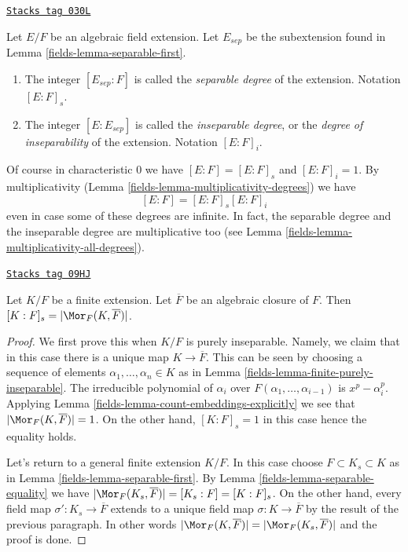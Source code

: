 \begin{definition}
\label{fields-definition-insep-degree}
\href{https://stacks.math.columbia.edu/tag/030L}{\texttt{Stacks tag 030L}}

Let $E/F$ be an algebraic field extension. Let $E_{sep}$ be the subextension
found in Lemma \ref{fields-lemma-separable-first}.
\begin{enumerate}
\item The integer $[E_{sep} : F]$ is called the {\it separable
degree} of the extension. Notation $[E : F]_s$.
\item The integer $[E : E_{sep}]$ is called the {\it inseparable
degree}, or the {\it degree of inseparability} of the extension.
Notation $[E : F]_i$.
\end{enumerate}
\end{definition}

Of course in characteristic $0$ we have $[E : F] = [E : F]_s$ and
$[E : F]_i = 1$. By multiplicativity
(Lemma \ref{fields-lemma-multiplicativity-degrees}) we have
$$
[E : F] = [E : F]_s [E : F]_i
$$
even in case some of these degrees are infinite. In fact, the separable
degree and the inseparable degree are multiplicative too (see
Lemma \ref{fields-lemma-multiplicativity-all-degrees}).

\begin{lemma}
\label{fields-lemma-separable-degree}
\href{https://stacks.math.columbia.edu/tag/09HJ}{\texttt{Stacks tag 09HJ}}

Let $K/F$ be a finite extension. Let $\overline{F}$ be an algebraic
closure of $F$. Then $[K : F]_s = |\Mor_F(K, \overline{F})|$.
\end{lemma}

\begin{proof}

We first prove this when $K/F$ is purely inseparable. Namely, we claim that
in this case there is a unique map $K \to \overline{F}$. This can be
seen by choosing a sequence of elements $\alpha_1, \ldots, \alpha_n \in K$
as in Lemma \ref{fields-lemma-finite-purely-inseparable}. The irreducible polynomial
of $\alpha_i$ over $F(\alpha_1, \ldots, \alpha_{i - 1})$ is $x^p - \alpha_i^p$.
Applying Lemma \ref{fields-lemma-count-embeddings-explicitly} we see that
$|\Mor_F(K, \overline{F})| = 1$. On the other hand, $[K : F]_s = 1$
in this case hence the equality holds.

\medskip\noindent
Let's return to a general finite extension $K/F$. In this case
choose $F \subset K_s \subset K$ as in Lemma \ref{fields-lemma-separable-first}.
By Lemma \ref{fields-lemma-separable-equality} we have
$|\Mor_F(K_s, \overline{F})| = [K_s : F] = [K : F]_s$.
On the other hand, every field map $\sigma' : K_s \to \overline{F}$
extends to a unique field map $\sigma : K \to \overline{F}$ by the
result of the previous paragraph. In other words
$|\Mor_F(K, \overline{F})| = |\Mor_F(K_s, \overline{F})|$
and the proof is done.
\end{proof}

